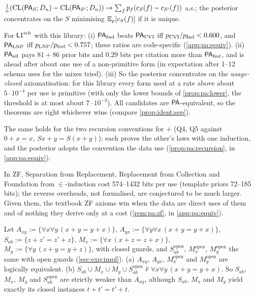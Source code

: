 \begin{proposition}\pabrk{}\label{prop:pa:usage}
$\frac1n(\mathrm{CL}(\mathsf{PA}_S;D_n)-\mathrm{CL}(\mathsf{PA}_{S'};D_n))\to\sum_fp_f(c_S(f)-c_{S'}(f))$ a.s.; the posterior concentrates on the $S$ minimising $\mathbb{E}_p[c_S(f)]$ if it is unique.
\end{proposition}

\begin{remark}\pabrk{}\label{rem:pa:usage}
For $\mathord{\mathsf{L1}}^{\mathrm{sch}}$ with this library: (i) $\mathsf{PA}_{\mathrm{Ind}}$ beats $\mathsf{PA}_{\mathrm{CVI}}$ iff $p_{\mathrm{CVI}}/p_{\mathrm{Ind}}<0.600$, and $\mathsf{PA}_{\mathrm{LNP}}$ iff $p_{\mathrm{LNP}}/p_{\mathrm{Ind}}<0.757$; these ratios are code-specific (\cref{app:pa:equiv}). (ii) $\mathsf{PA}_{\mathrm{all}}$ pays $81+86$ prior bits and $0.29$ bits per citation more than $\mathsf{PA}_{\mathrm{Ind}}$, and is ahead after about one use of a non-primitive form (in expectation after 1--12 schema uses for the mixes tried). (iii) So the posterior concentrates on the \emph{usage-closed} axiomatisation: for this library every form used at a rate above about $5\cdot10^{-4}$ per use is primitive (with only the lower bounds of \cref{prop:pa:lower}, the threshold is at most about $7\cdot10^{-3}$). All candidates are $\mathsf{PA}$-equivalent, so the theorems are right whichever wins (compare \cref{prop:ident:sep}).
\end{remark}

\noindent The same holds for the two recursion conventions for $+$ (Q4, Q5 against $0+x=x$, $Sx+y=S(x+y)$): each proves the other's laws with one induction, and the posterior adopts the convention the data use (\cref{prop:pa:recursion}, in \cref{app:pa:equiv}).

\noindent In ZF, Separation from Replacement, Replacement from Collection and Foundation from $\in$-induction cost 574--1432 bits per use (template priors 72--185 bits); the reverse overheads, not formalised, are conjectured to be much larger. Given them, the textbook ZF axioms win when the data are direct uses of them and of nothing they derive only at a cost (\cref{rem:pa:zf}, in \cref{app:pa:equiv}).

\begin{proposition}\pabrk{}\label{prop:exp:comm}
Let $A_{xy}:=\{\forall x\forall y\,(x+y=y+x)\}$, $A_{yx}:=\{\forall y\forall x\,(x+y=y+x)\}$, $S_{ab}:=\{z+z'=z'+z\}$, $M_x:=\{\forall x\,(x+z=z+x)\}$, $M_y:=\{\forall y\,(z+y=y+z)\}$, with closed guards, and $S_{ab}^{\mathrm{open}}$, $M_x^{\mathrm{open}}$, $M_y^{\mathrm{open}}$ the same with open guards (\cref{sec:exp:impl}).
\textup{(a)} $A_{xy}$, $A_{yx}$, $M_x^{\mathrm{open}}$ and $M_y^{\mathrm{open}}$ are logically equivalent.
\textup{(b)} $S_{ab}\cup M_x\cup M_y\cup S_{ab}^{\mathrm{open}}\nvdash\forall x\forall y\,(x+y=y+x)$. So $S_{ab}$, $M_x$, $M_y$ and $S_{ab}^{\mathrm{open}}$ are strictly weaker than $A_{xy}$, although $S_{ab}$, $M_x$ and $M_y$ yield exactly its closed instances $t+t'=t'+t$.
\end{proposition}


